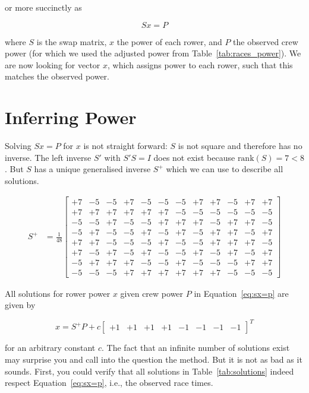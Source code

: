 \documentclass[a4paper,11pt]{article}
\begin{document}
or more succinctly as

\begin{equation}
\label{eq:sx=p}
S x = P
\end{equation}

where $S$ is the swap matrix, $x$ the power of each rower, and $P$ the
observed crew power (for which we used the adjusted power from
Table~\ref{tab:races_power}).  We are now looking for vector $x$, which
assigns power to each rower, such that this matches the observed power.

\section{Inferring Power}

Solving $Sx=P$ for $x$ is not straight forward: $S$ is not square and
therefore has no inverse.  The left inverse $S'$ with $S'S=I$ does not
exist because $\textrm{rank}(S)= 7 < 8$. But $S$ has a unique
generalised inverse $S^+$ which we can use to describe all solutions.

\begin{align}
  S^+ &= \frac{1}{48}
  \begin{bmatrix}
  +7&-5&-5&+7&-5&-5&-5&+7&+7&-5&+7&+7\\
  +7&+7&+7&+7&+7&+7&-5&-5&-5&-5&-5&-5\\
  -5&-5&+7&-5&-5&+7&+7&+7&-5&+7&+7&-5\\
  -5&+7&-5&-5&+7&-5&+7&-5&+7&+7&-5&+7\\
  +7&+7&-5&-5&-5&+7&-5&-5&+7&+7&+7&-5\\
  +7&-5&+7&-5&+7&-5&-5&+7&-5&+7&-5&+7\\
  -5&+7&+7&+7&-5&-5&+7&-5&-5&-5&+7&+7\\
  -5&-5&-5&+7&+7&+7&+7&+7&+7&-5&-5&-5
  \end{bmatrix}
\end{align}


All solutions for rower power $x$ given crew power $P$ in
Equation~\ref{eq:sx=p} are given by

\begin{equation}
  \label{eq:x=sp}
  x = S^+ P + c 
  \begin{bmatrix}
    +1&+1&+1&+1&-1&-1&-1&-1
  \end{bmatrix}^T
\end{equation}

for an arbitrary constant $c$. The fact that an infinite number of
solutions exist may surprise you and call into the question the method.
But it is not as bad as it sounds. First, you could verify that all
solutions in Table~\ref{tab:solutions} indeed respect
Equation~\ref{eq:sx=p}, i.e., the observed race times.
\end{document}
